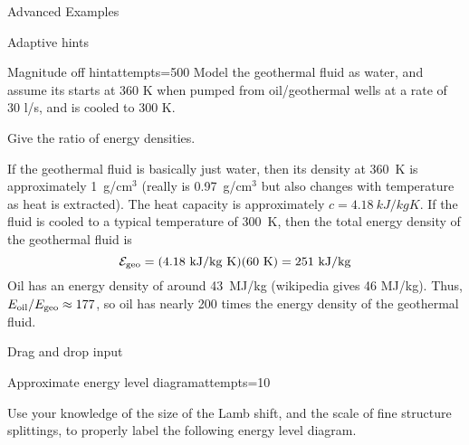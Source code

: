 \begin{edXchapter}{Advanced Examples}
\begin{edXsection}{Adaptive hints}
\begin{edXvertical}
\begin{edXproblem}{Magnitude off hint}{attempts=500}
Model the geothermal fluid as water, and assume its starts at 360 K
when pumped from oil/geothermal wells at a rate of 30 l/s, and is
cooled to 300 K.

Give the ratio of energy densities.

  
 
\begin{edXsolution}

  If the geothermal fluid is basically just water, then its density at
  360~K is approximately 1~g/cm$^3$ (really is 0.97~g/cm$^3$ but also
  changes with temperature as heat is extracted). The heat capacity is
  approximately $c = 4.18~kJ/kg K$. If the fluid is cooled to a
  typical temperature of 300~K, then the total energy density of the
  geothermal fluid is
\begin{equation}
\mathcal{E}_{\rm geo} = \rm(4.18~kJ/kg~K)(60~K) = 251~kJ/kg
\end{equation}
Oil has an energy density of around 43~MJ/kg (wikipedia gives 46
MJ/kg).  Thus, $E_{\rm oil}/E_{\rm geo} \approx 177$, so oil has
nearly 200 times the energy density of the geothermal fluid.  

\end{edXsolution}

\end{edXproblem}


\end{edXvertical}

\end{edXsection}


\begin{edXsection}{Drag and drop input}

\begin{edXvertical}

\begin{edXproblem}{Approximate energy level diagram}{attempts=10}

Use your knowledge of the size of the Lamb shift, and the scale of fine
structure splittings, to properly label the following energy level diagram.


\begin{edXsolution}


\end{edXsolution}
\end{edXproblem}
\end{edXvertical}
\end{edXsection}
\end{edXchapter}
